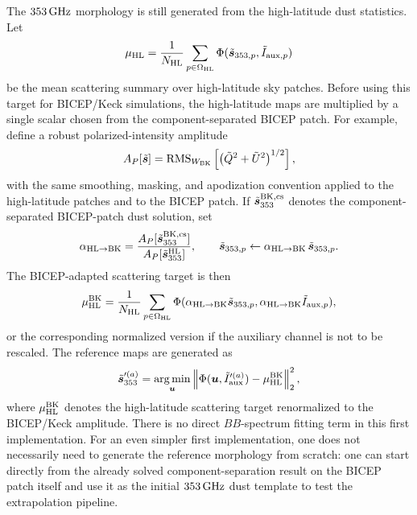 \documentclass[11pt]{article}
\begin{document}
The $353\,{\rm GHz}$ morphology is still generated from the high-latitude dust
statistics.  Let
\[
  \mu_{\rm HL}
  =
  \frac{1}{N_{\rm HL}}
  \sum_{p\in\Omega_{\rm HL}}
  \Phi(\tilde{\bm s}_{353,p},\tilde I_{{\rm aux},p})
\]
be the mean scattering summary over high-latitude sky patches.  Before using
this target for BICEP/Keck simulations, the high-latitude maps are multiplied
by a single scalar chosen from the component-separated BICEP patch.  For
example, define a robust polarized-intensity amplitude
\[
  A_P[\tilde{\bm s}]
  =
  {\rm RMS}_{W_{\rm BK}}
  \left[
    \left(\tilde Q^2+\tilde U^2\right)^{1/2}
  \right],
\]
with the same smoothing, masking, and apodization convention applied to the
high-latitude patches and to the BICEP patch.  If
$\tilde{\bm s}_{353}^{\rm BK,cs}$ denotes the component-separated BICEP-patch
dust solution, set
\[
  \alpha_{\rm HL\to BK}
  =
  \frac{
    A_P[\tilde{\bm s}_{353}^{\rm BK,cs}]
  }{
    A_P[\tilde{\bm s}_{353}^{\rm HL}]
  },
  \qquad
  \tilde{\bm s}_{353,p}
  \leftarrow
  \alpha_{\rm HL\to BK}\,
  \tilde{\bm s}_{353,p}.
\]
The BICEP-adapted scattering target is then
\[
  \mu_{\rm HL}^{\rm BK}
  =
  \frac{1}{N_{\rm HL}}
  \sum_{p\in\Omega_{\rm HL}}
  \Phi(\alpha_{\rm HL\to BK}\tilde{\bm s}_{353,p},
       \alpha_{\rm HL\to BK}\tilde I_{{\rm aux},p}),
\]
or the corresponding normalized version if the auxiliary channel is not to be
rescaled.  The reference maps are generated as
\[
  \tilde{\bm s}_{353}^{\prime(a)}
  =
  \operatorname*{arg\,min}_{\bm u}
  \left\|
    \Phi(\bm u,\tilde I_{\rm aux}^{\prime(a)})
    -
    \mu_{\rm HL}^{\rm BK}
  \right\|_2^2,
\]
where $\mu_{\rm HL}^{\rm BK}$ denotes the high-latitude scattering target
renormalized to the BICEP/Keck amplitude.  There is no direct $BB$-spectrum
fitting term in this first implementation.  For an even simpler first
implementation, one does not necessarily need to generate the reference
morphology from scratch: one can start directly from the already solved
component-separation result on the BICEP patch itself and use it as the
initial $353\,{\rm GHz}$ dust template to test the extrapolation pipeline.
\end{document}

